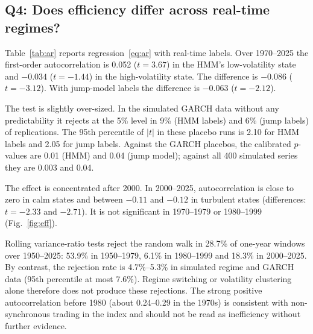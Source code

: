 \documentclass[conference]{IEEEtran}
\begin{document}
\subsection{Q4: Does efficiency differ across real-time regimes?}
Table~\ref{tab:ar} reports regression~\eqref{eq:ar} with real-time labels. Over 1970--2025 the first-order autocorrelation is 0.052 ($t = 3.67$) in the HMM's low-volatility state and $-0.034$ ($t = -1.44$) in the high-volatility state. The difference is $-0.086$ ($t = -3.12$). With jump-model labels the difference is $-0.063$ ($t = -2.12$).

The test is slightly over-sized. In the simulated GARCH data without any predictability it rejects at the 5\% level in 9\% (HMM labels) and 6\% (jump labels) of replications. The 95th percentile of $|t|$ in these placebo runs is 2.10 for HMM labels and 2.05 for jump labels. Against the GARCH placebos, the calibrated $p$-values are 0.01 (HMM) and 0.04 (jump model); against all 400 simulated series they are 0.003 and 0.04.

The effect is concentrated after 2000. In 2000--2025, autocorrelation is close to zero in calm states and between $-0.11$ and $-0.12$ in turbulent states (differences: $t = -2.33$ and $-2.71$). It is not significant in 1970--1979 or 1980--1999 (Fig.~\ref{fig:eff}).

Rolling variance-ratio tests reject the random walk in 28.7\% of one-year windows over 1950--2025: 53.9\% in 1950--1979, 6.1\% in 1980--1999 and 18.3\% in 2000--2025. By contrast, the rejection rate is 4.7\%--5.3\% in simulated regime and GARCH data (95th percentile at most 7.6\%). Regime switching or volatility clustering alone therefore does not produce these rejections. The strong positive autocorrelation before 1980 (about 0.24--0.29 in the 1970s) is consistent with non-synchronous trading in the index \cite{lomackinlay1990} and should not be read as inefficiency without further evidence.
\end{document}
